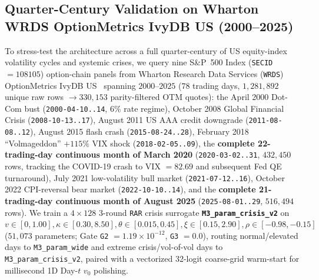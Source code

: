 \documentclass[11pt,a4paper]{article}
\begin{document}
\subsection{Quarter-Century Validation on Wharton WRDS OptionMetrics IvyDB US (2000--2025)}
\label{sec:wrds}

To stress-test the architecture across a full quarter-century of US equity-index volatility cycles and systemic crises, we query nine S\&P~500 Index (\texttt{SECID} $= 108105$) option-chain panels from Wharton Research Data Services (\texttt{WRDS}) OptionMetrics IvyDB US~\cite{wrds2026} spanning $2000\text{--}2025$ ($78$ trading days, $1{,}281{,}892$ unique raw rows $\to 330{,}153$ parity-filtered OTM quotes): the April 2000 Dot-Com bust (\texttt{2000-04-10..14}, $6\%$ rate regime), October 2008 Global Financial Crisis (\texttt{2008-10-13..17}), August 2011 US AAA credit downgrade (\texttt{2011-08-08..12}), August 2015 flash crash (\texttt{2015-08-24..28}), February 2018 ``Volmageddon'' $+115\%$ VIX shock (\texttt{2018-02-05..09}), the \textbf{complete 22-trading-day continuous month of March 2020} (\texttt{2020-03-02..31}, $432{,}450$ rows, tracking the COVID-19 crash to VIX $= 82.69$ and subsequent Fed QE turnaround), July 2021 low-volatility bull market (\texttt{2021-07-12..16}), October 2022 CPI-reversal bear market (\texttt{2022-10-10..14}), and the \textbf{complete 21-trading-day continuous month of August 2025} (\texttt{2025-08-01..29}, $516{,}494$ rows). We train a $4 \times 128$ 3-round \texttt{RAR} crisis surrogate \textbf{\texttt{M3\_param\_crisis\_v2}} on $v \in [0, 1.00], \kappa \in [0.30, 8.50], \theta \in [0.015, 0.45], \xi \in [0.15, 2.90], \rho \in [-0.98, -0.15]$ ($51{,}073$ parameters; Gate \texttt{G2} $= 1.19 \times 10^{-12}$, \texttt{G3} $= 0.0$), routing normal/elevated days to \texttt{M3\_param\_wide} and extreme crisis/vol-of-vol days to \texttt{M3\_param\_crisis\_v2}, paired with a vectorized 32-logit coarse-grid warm-start for millisecond 1D Day-$t$ $v_0$ polishing.
\end{document}
